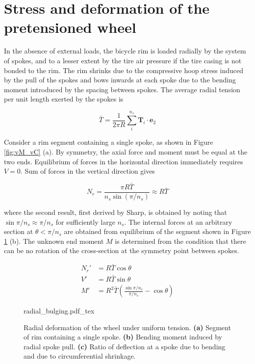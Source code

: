 \documentclass[../thesis.tex]{subfiles}
\newcommand{\et}{\mathbf{e}_2}
\begin{document}
\section{Stress and deformation of the pretensioned wheel}

In the absence of external loads, the bicycle rim is loaded radially by the system of spokes, and to a lesser extent by the tire air pressure if the tire casing is not bonded to the rim\cite{Burgoyne}. The rim shrinks due to the compressive hoop stress induced by the pull of the spokes and bows inwards at each spoke due to the bending moment introduced by the spacing between spokes. The average radial tension per unit length exerted by the spokes is

\begin{equation}
\label{eq:Tbar}
\bar{T} = \frac{1}{2\pi R} \sum_i^{n_s} \mathbf{T}_i\cdot\et
\end{equation}

Consider a rim segment containing a single spoke, as shown in Figure \ref{fig:vM_vC} (a). By symmetry, the axial force and moment must be equal at the two ends. Equilibrium of forces in the horizontal direction immediately requires $V=0$. Sum of forces in the vertical direction gives

\begin{equation}
\label{eq:Nr}
N_r = \frac{\pi R\bar{T}}{n_s\sin{(\pi/n_s)}} \approx R\bar{T}
\end{equation}

where the second result, first derived by Sharp\cite{Sharp}, is obtained by noting that $\sin{\pi/n_s}\approx \pi/n_s$ for sufficiently large $n_s$. The internal forces at an arbitrary section at $\theta < \pi/n_s$ are obtained from equilibrium of the segment shown in Figure \ref{fig:radial_bulging} (b). The unknown end moment $M$ is determined from the condition that there can be no rotation of the cross-section at the symmetry point between spokes.

\begin{subequations}
\begin{align}
\label{eq:NVM}
N_r' &= R\bar{T}\cos{\theta}\\
V'   &= R\bar{T}\sin{\theta}\\
M'   &= R^2\bar{T} \left( \frac{\sin{\pi/n_s}}{\pi/n_s} - \cos{\theta} \right)
\end{align}
\end{subequations}

\begin{figure}
\label{fig:radial_bulging}
\centering
{}
{radial_bulging.pdf_tex}
\caption{Radial deformation of the wheel under uniform tension. \textbf{(a)} Segment of rim containing a single spoke. \textbf{(b)} Bending moment induced by radial spoke pull. \textbf{(c)} Ratio of deflection at a spoke due to bending and due to circumferential shrinkage.}
\end{figure}
\end{document}
